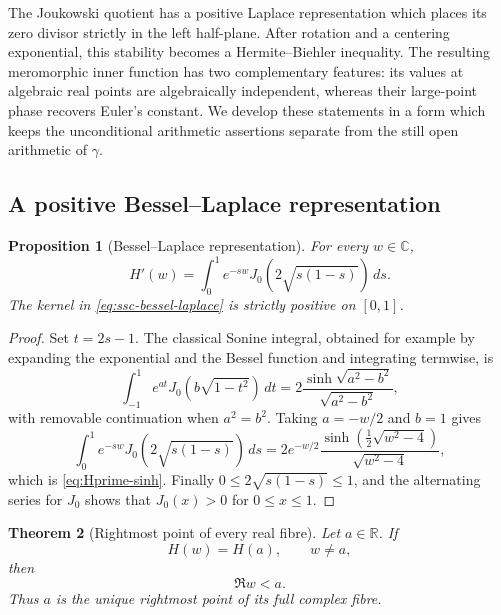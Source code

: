 \documentclass[11pt]{article}
\newtheorem{theorem}{Theorem}[section]
\newtheorem{proposition}[theorem]{Proposition}
\theoremstyle{definition}
\theoremstyle{remark}
\newcommand{\C}{\mathbb C}
\begin{document}
The Joukowski quotient has a positive Laplace representation which places
its zero divisor strictly in the left half-plane.  After rotation and a
centering exponential, this stability becomes a Hermite--Biehler
inequality.  The resulting meromorphic inner function has two complementary
features: its values at algebraic real points are algebraically independent,
whereas their large-point phase recovers Euler's constant.  We develop these
statements in a form which keeps the unconditional arithmetic assertions
separate from the still open arithmetic of \(\gamma\).

\subsection{A positive Bessel--Laplace representation}

\begin{proposition}[Bessel--Laplace representation]
\label{prop:ssc-bessel-laplace}
For every \(w\in\C\),
\begin{equation}\label{eq:ssc-bessel-laplace}
 H'(w)=\int_0^1 e^{-sw}
 J_0\!\left(2\sqrt{s(1-s)}\right)\,ds.
\end{equation}
The kernel in \eqref{eq:ssc-bessel-laplace} is strictly positive on
\([0,1]\).
\end{proposition}

\begin{proof}
Set \(t=2s-1\).  The classical Sonine integral, obtained for example by
expanding the exponential and the Bessel function and integrating
termwise, is
\[
 \int_{-1}^{1}e^{at}J_0\!\left(b\sqrt{1-t^2}\right)\,dt
 =2\frac{\sinh\sqrt{a^2-b^2}}{\sqrt{a^2-b^2}},
\]
with removable continuation when \(a^2=b^2\).  Taking
\(a=-w/2\) and \(b=1\) gives
\[
 \int_0^1 e^{-sw}J_0\!\left(2\sqrt{s(1-s)}\right)\,ds
 =2e^{-w/2}
   \frac{\sinh(\frac12\sqrt{w^2-4})}{\sqrt{w^2-4}},
\]
which is \eqref{eq:Hprime-sinh}.  Finally
\(0\leq2\sqrt{s(1-s)}\leq1\), and the alternating series for \(J_0\)
shows that \(J_0(x)>0\) for \(0\leq x\leq1\).
\end{proof}

\begin{theorem}[Rightmost point of every real fibre]
\label{thm:ssc-rightmost-fibre}
Let \(a\in\mathbb R\).  If
\[
 H(w)=H(a),\qquad w\ne a,
\]
then
\begin{equation}\label{eq:ssc-rightmost-fibre}
 \Re w<a.
\end{equation}
Thus \(a\) is the unique rightmost point of its full complex fibre.
\end{theorem}
\end{document}
